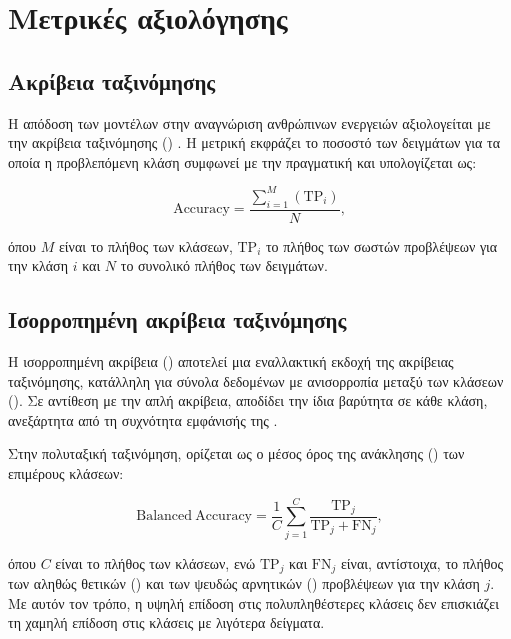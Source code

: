 \section{Μετρικές αξιολόγησης}
\label{sec:evaluation-metrics}

\subsection{Ακρίβεια ταξινόμησης}
\label{subsec:classification-accuracy}

Η απόδοση των μοντέλων στην αναγνώριση ανθρώπινων ενεργειών αξιολογείται
με την ακρίβεια ταξινόμησης ()
\cite{goodfellow2016deep}. Η μετρική εκφράζει το ποσοστό των δειγμάτων για
τα οποία η προβλεπόμενη κλάση συμφωνεί με την πραγματική και υπολογίζεται
ως:

\begin{equation}
    \mathrm{Accuracy}
    =
    \frac{\sum\nolimits_{i=1}^{M}\left(\mathrm{TP}_i\right)}{N},
\end{equation}

όπου \(M\) είναι το πλήθος των κλάσεων, \(\mathrm{TP}_i\) το πλήθος των
σωστών προβλέψεων για την κλάση \(i\) και \(N\) το συνολικό πλήθος των
δειγμάτων.

\subsection{Ισορροπημένη ακρίβεια ταξινόμησης}
\label{subsec:balanced-accuracy}

Η ισορροπημένη ακρίβεια () αποτελεί μια εναλλακτική
εκδοχή της ακρίβειας ταξινόμησης, κατάλληλη για σύνολα δεδομένων με
ανισορροπία μεταξύ των κλάσεων (). Σε αντίθεση με
την απλή ακρίβεια, αποδίδει την ίδια βαρύτητα σε κάθε κλάση, ανεξάρτητα
από τη συχνότητα εμφάνισής της \cite{collot2026balanced}.

Στην πολυταξική ταξινόμηση, ορίζεται ως ο μέσος όρος της ανάκλησης
() των επιμέρους κλάσεων:

\begin{equation}
    \mathrm{Balanced\ Accuracy}
    =
    \frac{1}{C}
    \sum_{j=1}^{C}
    \frac{\mathrm{TP}_j}
         {\mathrm{TP}_j+\mathrm{FN}_j},
\end{equation}

όπου \(C\) είναι το πλήθος των κλάσεων, ενώ \(\mathrm{TP}_j\) και
\(\mathrm{FN}_j\) είναι, αντίστοιχα, το πλήθος των αληθώς θετικών () και
των ψευδώς αρνητικών () προβλέψεων για την κλάση \(j\). Με αυτόν τον τρόπο,
η υψηλή επίδοση στις πολυπληθέστερες κλάσεις δεν επισκιάζει τη χαμηλή
επίδοση στις κλάσεις με λιγότερα δείγματα.

